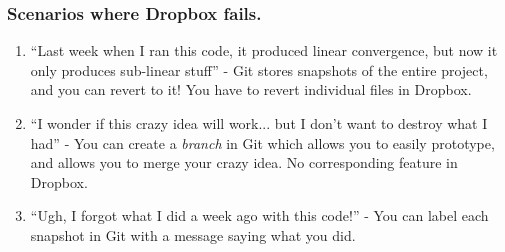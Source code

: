 \documentclass{beamer}
\begin{document}
\begin{frame}
	\frametitle{Scenarios where Dropbox fails.}
	\begin{enumerate}
		\item ``Last week when I ran this code, it produced linear convergence, but now it only produces sub-linear stuff'' - Git stores snapshots of the entire project, and you can revert to it! You have to revert individual files in Dropbox. \pause
		\item ``I wonder if this crazy idea will work... but I don't want to destroy what I had'' - You can create a \emph{branch} in Git which allows you to easily prototype, and allows you to merge your crazy idea. No corresponding feature in Dropbox. 
		\item ``Ugh, I forgot what I did a week ago with this code!'' - You can label each snapshot in Git with a message saying what you did. 
	\end{enumerate}
\end{frame}
\end{document}
